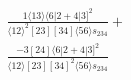 \documentclass[varwidth, border=5pt]{standalone}
\begin{document}
\begin{my}
$\begin{gathered}
\scriptscriptstyle\frac{1⟨13⟩⟨6|2+4|3]^2}{⟨12⟩^2[23][34]⟨56⟩s_{234}}+\\
\scriptscriptstyle\frac{-3[24]⟨6|2+4|3]^2}{⟨12⟩[23][34]^2⟨56⟩s_{234}}\phantom{+}
\end{gathered}$
\end{my}
\end{document}
